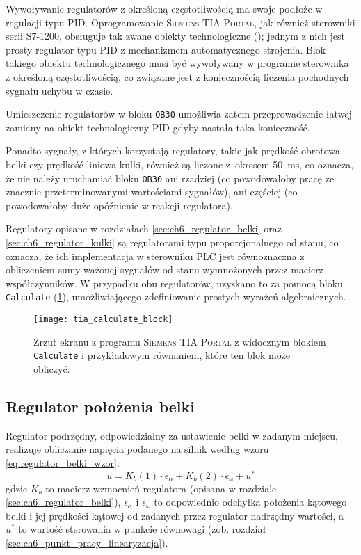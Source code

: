 Wywoływanie regulatorów z określoną częstotliwością ma swoje podłoże w regulacji typu PID. Oprogramowanie \textsc{Siemens TIA Portal}, jak również sterowniki serii S7-1200, obsługuje tak zwane obiekty technologiczne (\cite{S7MANUAL}\cite{SCL_S71200_S71500}); jednym z nich jest prosty regulator typu PID z mechanizmem automatycznego strojenia. Blok takiego obiektu technologicznego musi być wywoływany w programie sterownika z określoną częstotliwością, co związane jest z koniecznością liczenia pochodnych sygnału uchybu w czasie.

Umieszczenie regulatorów w bloku \texttt{OB30} umożliwia zatem przeprowadzenie łatwej zamiany na obiekt technologiczny PID gdyby nastała taka konieczność.

Ponadto sygnały, z których korzystają regulatory, takie jak prędkość obrotowa belki czy prędkość liniowa kulki, również są liczone z~okresem \SI{50}{\milli\second}, co oznacza, że nie należy uruchamiać bloku \texttt{OB30} ani rzadziej (co powodowałoby pracę ze znacznie przeterminowanymi wartościami sygnałów), ani częściej (co powodowałoby duże opóźnienie w reakcji regulatora).

Regulatory opisane w rozdziałach \ref{sec:ch6_regulator_belki} oraz \ref{sec:ch6_regulator_kulki} są regulatorami typu proporcjonalnego od stanu, co oznacza, że ich implementacja w sterowniku PLC jest równoznaczna z obliczeniem sumy ważonej sygnałów od stanu wymnożonych przez macierz współczynników. W przypadku obu regulatorów, uzyskano to za pomocą bloku \texttt{Calculate} (\cref{fig:tia_portal_blok_calculate}), umożliwiającego zdefiniowanie prostych wyrażeń algebraicznych.

\begin{figure}[h]
    \centering
    \texttt{[image: tia\_calculate\_block]}
    \caption{Zrzut ekranu z programu \textsc{Siemens TIA Portal} z widocznym blokiem \texttt{Calculate} i przykładowym równaniem, które ten blok może obliczyć.}
    \label{fig:tia_portal_blok_calculate}
\end{figure}


\subsection{Regulator położenia belki}
\label{subsec:ch7_regulator_belki}

Regulator podrzędny, odpowiedzialny za ustawienie belki w zadanym miejscu, realizuje obliczanie napięcia podanego na silnik według wzoru \eqref{eq:regulator_belki_wzor}:
\begin{equation}
    u = K_b(1) \cdot \epsilon_\alpha + K_b(2) \cdot \epsilon_\omega + u^*
    \label{eq:regulator_belki_wzor}
\end{equation}
gdzie $K_b$ to macierz wzmocnień regulatora (opisana w rozdziale \ref{sec:ch6_regulator_belki}), $\epsilon_\alpha$ i $\epsilon_\omega$ to odpowiednio odchyłka położenia kątowego belki i jej prędkości kątowej od zadanych przez regulator nadrzędny wartości, a $u^*$ to wartość sterowania w punkcie równowagi (zob. rozdział \ref{sec:ch6_punkt_pracy_linearyzacja}).

